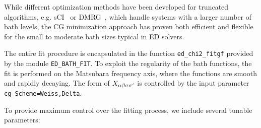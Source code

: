 \documentclass[edipack_sp.tex]{subfiles}
\begin{document}
While different optimization methods have been developed for 
truncated algorithms, e.g. sCI~\cite{Mejuto_Bath_ASCI-DMFT} or DMRG~\cite{Bauernfeind2017PRX}, 
which handle systems with a 
larger number of bath levels, the CG minimization approach has proven 
both efficient and flexible for the small to moderate bath sizes 
typical in ED solvers. 

The entire fit procedure is encapsulated in the function 
\texttt{ed\_chi2\_fitgf} provided by the module 
\texttt{ED\_BATH\_FIT}. To exploit the regularity of the bath functions, 
the fit is performed on the Matsubara frequency axis, where the functions 
are smooth and rapidly decaying. The form of $X_{\alpha\beta\sigma\sigma'}$ is controlled 
by the input parameter \texttt{cg\_Scheme=Weiss,Delta}.

To provide maximum control over the fitting process, we include several 
tunable parameters:
\end{document}
